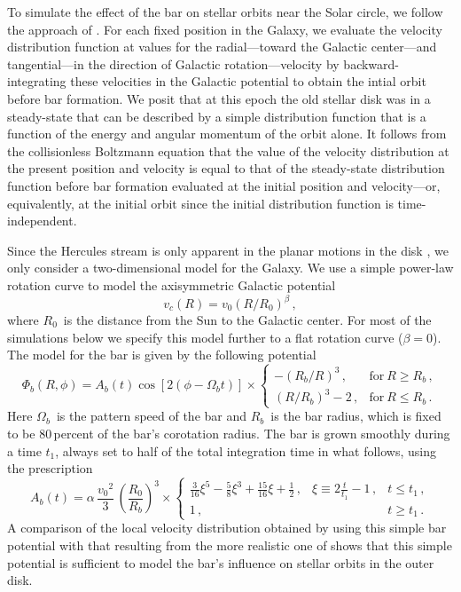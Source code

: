 \documentclass[12pt,preprint]{aastex}
\newcommand{\eg}{e.g.}
\newcommand{\vo}{\ensuremath{v_0}}
\newcommand{\Ro}{\ensuremath{R_0}}
\newcommand{\Ab}{\ensuremath{A_b}}
\newcommand{\Rb}{\ensuremath{R_b}}
\newcommand{\Omegab}{\ensuremath{\Omega_b}}
\begin{document}
To simulate the effect of the bar on stellar orbits near the Solar
circle, we follow the approach of \citet{dehnen00a}. For each fixed
position in the Galaxy, we evaluate the velocity distribution function
at values for the radial---toward the Galactic center---and
tangential---in the direction of Galactic rotation---velocity by
backward-integrating these velocities in the Galactic potential to
obtain the intial orbit before bar formation. We posit that at this
epoch the old stellar disk was in a steady-state that can be described
by a simple distribution function that is a function of the energy and
angular momentum of the orbit alone. It follows from the collisionless
Boltzmann equation that the value of the velocity distribution at the
present position and velocity is equal to that of the steady-state
distribution function before bar formation evaluated at the initial
position and velocity---or, equivalently, at the initial orbit since
the initial distribution function is time-independent.

Since the Hercules stream is only apparent in the planar motions in
the disk \citep[\eg,][]{Bovy09a}, we only consider a two-dimensional
model for the Galaxy. We use a simple power-law rotation curve to
model the axisymmetric Galactic potential
\begin{equation}
v_c(R) = \vo(R/\Ro)^\beta \,,
\end{equation}
where \Ro\ is the distance from the Sun to the Galactic center. For
most of the simulations below we specify this model further to a flat
rotation curve ($\beta = 0$). The model for the bar is given by the
following potential
\begin{equation}
\Phi_b(R,\phi) = \Ab(t) \cos [2(\phi - \Omegab t)] \times
\left\{ \begin{array}{ll} -(\Rb/R)^3\,, & \mathrm{for}\ R \geq
  \Rb\,,\\ (R/\Rb)^3-2\,, & \mathrm{for}\ R \leq \Rb\,. \end{array}
\right.
\end{equation}
Here \Omegab\ is the pattern speed of the bar and \Rb\ is the bar
radius, which is fixed to be 80\,percent of the bar's corotation
radius. The bar is grown smoothly during a time $t_1$, always set to
half of the total integration time in what follows, using the
prescription
\begin{equation}
\Ab(t) = \alpha \, \frac{\vo^2}{3}\,\left(\frac{\Ro}{\Rb}\right)^3
\times \left\{ \begin{array}{lll}
\frac{3}{16}\xi^5 - \frac{5}{8} \xi^3 + \frac{15}{16} \xi + \frac{1}{2}\,, & \xi \equiv 2\frac{t}{t_1}-1\,, & t \leq t_1\,,\\
1\,, & & t \geq t_1\,.\end{array} \right. 
\end{equation}
A comparison of the local velocity distribution obtained by using this
simple bar potential with that resulting from the more realistic one
of \citet{gardner10a} shows that this simple potential is sufficient
to model the bar's influence on stellar orbits in the outer disk.
\end{document}
